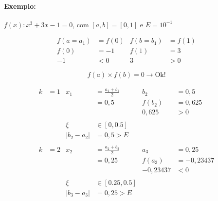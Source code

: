 \documentclass{article}
\begin{document}
        \paragraph{Exemplo:} $f(x) : x^3 + 3x - 1= 0$, com $[a,b] = [0,1]$ e $E = 10^{-1}$

        \begin{align*}
            f(a = a_1) &= f(0)  &   f(b = b_1) &= f(1)\\
            f(0) &= -1          &   f(1) &= 3\\
            -1 &< 0             &   3 &> 0
        \end{align*}

        \[f(a) \times f(b) = 0 \rightarrow \text{Ok!}\]

        \begin{align*}
            k &= 1          &           x_1 &= \frac{a_1 + b_1}{2}      &       b_2 &= 0,5\\
            &               &           &= 0,5                          &       f(b_2) &= 0,625\\
            &               &           &                               &       0,625 &> 0\\
            \\
            &               &           \xi &\in [0,0.5]\\
            &               &           |b_2 - a_2| &= 0,5 > E\\
            \\
            k &= 2          &           x_2 &= \frac{a_2 + b_2}{2}      &       a_3 &= 0,25\\
            &               &           &= 0,25                         &       f(a_3) &= -0,23437\\
            &               &           &                               &       -0,23437 &< 0\\
            \\
            &               &           \xi &\in [0.25,0.5]\\
            &               &           |b_3 - a_3| &= 0,25 > E
        \end{align*}
\end{document}
